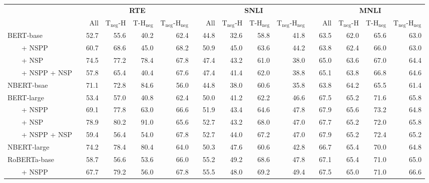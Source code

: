 \newcommand{\sig}{$^{\ast}$}
\setlength{\tabcolsep}{0.03in}
\footnotesize
\begin{tabular}{l r@{\hspace{0.10in}} rrrr r@{\hspace{0.10in}} rrrr r@{\hspace{0.10in}} rrrr}
\toprule 
&& \multicolumn{4}{c}{\textbf{RTE}} && \multicolumn{4}{c}{\textbf{SNLI}} && \multicolumn{4}{c}{\textbf{MNLI}} \\ \cmidrule{3-6} \cmidrule{8-11} \cmidrule{13-16}
&& All & $\text{T}_{\text{neg}}$-H & T-$\text{H}_{\text{neg}}$ & $\text{T}_{\text{neg}}$-$\text{H}_{\text{neg}}$ && All & $\text{T}_{\text{neg}}$-H & T-$\text{H}_{\text{neg}}$ & $\text{T}_{\text{neg}}$-$\text{H}_{\text{neg}}$ && All & $\text{T}_{\text{neg}}$-H & T-$\text{H}_{\text{neg}}$ & $\text{T}_{\text{neg}}$-$\text{H}_{\text{neg}}$ \\
\midrule
{BERT-base} && 52.7 & 55.6 & 40.2 & 62.4 && 44.8 & 32.6 & 58.8 & 41.8 && 63.5 & 62.0 & 65.6 & 63.0\\ 
~~~~+ NSPP && 60.7 & 68.6 & 45.0 & 68.2 && 50.9 & 45.0 & 63.6 & 44.2 && 63.8 & 62.4 & 66.0 & 63.0\\ 
~~~~+ NSP && 74.5 & 77.2 & 78.4 & 67.8 && 47.4 & 43.2 & 61.0 & 38.0 && 65.0 & 63.6 & 67.0 & 64.4\\ 
~~~~+ NSPP + NSP && 57.8 & 65.4 & 40.4 & 67.6 && 47.4 & 41.4 & 62.0 & 38.8 && 65.1 & 63.8 & 66.8 & 64.6\\ 
{NBERT-bsae} && 71.1 & 72.8 & 84.6 & 56.0 && 44.8 & 38.0 & 60.6 & 35.8 && 63.8 & 64.2 & 65.5 & 61.4\\
\midrule
{BERT-large} && 53.4 & 57.0 & 40.8 & 62.4 && 50.0 & 41.2 & 62.2 & 46.6 && 67.5 & 65.2 & 71.6 & 65.8\\ 
~~~~+ NSPP && 69.1 & 77.8 & 63.0 & 66.6 && 51.9 & 43.4 & 64.6 & 47.8 && 67.9 & 65.6 & 73.2 & 64.8\\ 
~~~~+ NSP && 78.9 & 80.2 & 91.0 & 65.6 && 52.7 & 43.2 & 68.0 & 47.0 && 67.7 & 65.2 & 72.0 & 65.8\\ 
~~~~+ NSPP + NSP && 59.4 & 56.4 & 54.0 & 67.8 && 52.7 & 44.0 & 67.2 & 47.0 && 67.9 & 65.2 & 72.4 & 65.2\\ 
{NBERT-large} && 74.2 & 78.4 & 80.4 & 64.0 && 50.3 & 47.6 & 60.6 & 42.8 && 66.7 & 65.4 & 70.0 & 64.8\\
\midrule
\midrule
{RoBERTa-base} &&  58.7  &  56.6  &  53.6  &  66.0  &&  55.2  &  49.2  &  68.6  &  47.8  &&  67.1  &  65.4  &  71.0  &  65.0  \\ 
~~~~+ NSPP &&  67.7 & 79.2 & 56.0 & 67.8  &&  55.5  &  48.0  &  69.2  &  49.4  &&  67.5  &  65.0  &  71.0  &  66.6  \\ 

\end{tabular}
